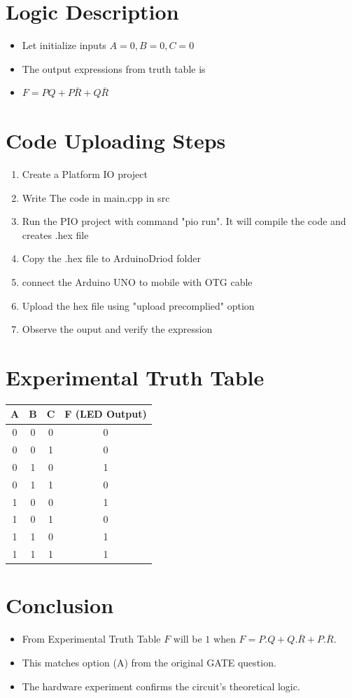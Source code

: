 \documentclass[a4paper,12pt]{article}
\begin{document}
\section*{Logic Description}
\begin{itemize}
	\item Let initialize inputs $A=0,B=0,C=0$
	\item The output expressions from truth  table is
	\item $F=PQ+P\bar{R}+Q\bar{R}$
\end{itemize}
\section*{Code Uploading Steps}
\begin{enumerate}
	\item Create a Platform IO project
	\item Write The code in main.cpp in src
	\item Run the PIO project with command "pio run". It will compile the code and creates .hex file
	\item Copy the .hex file to ArduinoDriod folder
	\item connect the Arduino UNO to mobile with OTG cable
	\item Upload the hex file using "upload precomplied" option
	\item Observe the ouput and verify the expression
\end{enumerate}
\section*{Experimental Truth Table}
\begin{table}[H]
\centering
\begin{tabular}{|c|c|c|c|}
\hline
A & B & C & F (LED Output) \\ \hline
0 & 0 & 0 & 0 \\
0 & 0 & 1 & 0 \\
0 & 1 & 0 & 1 \\
0 & 1 & 1 & 0 \\
1 & 0 & 0 & 1 \\
1 & 0 & 1 & 0 \\
1 & 1 & 0 & 1 \\
1 & 1 & 1 & 1 \\
\hline
\end{tabular}
\end{table}
\section*{Conclusion}
\begin{itemize}
    	\item From Experimental Truth Table $F$ will be $1$ when $F=P.Q+Q.\overline{R}+P.\overline{R}$. 
	\item This matches option (A) from the original GATE question.
    	\item The hardware experiment confirms the circuit's theoretical logic.
\end{itemize}
\end{document}
